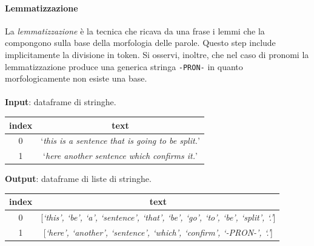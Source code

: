 \documentclass[12pt]{report}
\theoremstyle{definition}
\begin{document}
\paragraph{Lemmatizzazione}
La \textit{lemmatizzazione} è la tecnica che ricava da una frase i lemmi che la compongono sulla base della morfologia delle parole.
Questo step include implicitamente la divisione in token.
Si osservi, inoltre, che nel caso di pronomi la lemmatizzazione produce una generica stringa \texttt{-PRON-} in quanto morfologicamente non esiste una base.
\\
\\
\textbf{Input}: dataframe di stringhe.
\begin{center}
    \begin{tabular}{|c|c|}
    \hline
    \textbf{index} & \textbf{text} \\
    \hline
         0 & `\textit{this is a sentence that is going to be split.}'\\
         1 & `\textit{here another sentence which confirms it.}'\\
    \hline
    \end{tabular}
\end{center}
\textbf{Output}: dataframe di liste di stringhe.
\begin{center}
    \begin{tabular}{|c|c|}
    \hline
    \textbf{index} & \textbf{text} \\
    \hline
         0 & [\textit{`this', `be', `a', `sentence', `that', `be', `go', `to', `be', `split', `.'}]\\
         1 & [\textit{`here', `another', `sentence', `which', `confirm', `-PRON-', `.'}]\\
    \hline
    \end{tabular}
\end{center}
\end{document}
